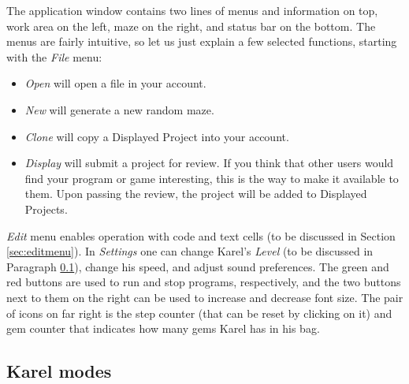 The application window contains two lines of menus and information on top,
work area on the left, maze on the right, and status bar on the bottom.
The menus are fairly intuitive, so let us just explain a few selected 
functions, starting with the {\em File} menu:

\begin{itemize}
\item {\em Open} will open a file in your account.
\item {\em New} will generate a new random maze.
\item {\em Clone} will copy a Displayed Project into your account. 
\item {\em Display} will submit a project for review. If you think that 
      other users would find your program or game interesting, this is the way to make it 
      available to them. Upon passing the review, the project will be added to Displayed Projects.
\end{itemize}
{\em Edit} menu enables operation with code and text cells (to be discussed in 
Section \ref{sec:editmenu}). In {\em Settings} one can change Karel's {\em Level} (to be discussed
in Paragraph \ref{levels}), change his speed, and adjust sound preferences. The green and red 
buttons are used to run and stop programs, respectively, and the two buttons next to them on
the right can be used to increase and decrease font size. The pair of icons on far right is the 
step counter (that can be reset by clicking on it) and gem counter that indicates how many gems 
Karel has in his bag.

\subsection{Karel modes} \label{levels}

